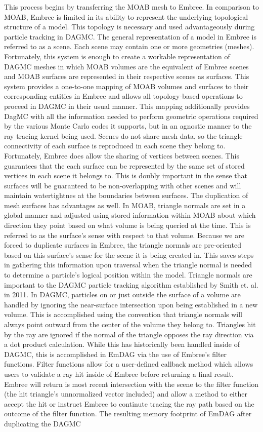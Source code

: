 \documentclass[10pt, a4paper]{article}
\begin{document}
This process begins by transferring the MOAB mesh to Embree. In comparison to MOAB, Embree is limited in its ability to represent the underlying topological structure of a model. This topology is necessary and used advantageously during particle tracking in DAGMC. The general representation of a model in Embree is referred to as a scene. Each scene may contain one or more geometries (meshes). Fortunately, this system is enough to create a workable representation of DAGMC meshes in which MOAB volumes are the equivalent of Embree scenes and MOAB surfaces are represented in their respective scenes as surfaces. This system provides a one-to-one mapping of MOAB volumes and surfaces to their corresponding entities in Embree and allows all topology-based operations to proceed in DAGMC in their usual manner. This mapping additionally provides DagMC with all the information needed to perform geometric operations required by the various Monte Carlo codes it supports, but in an agnostic manner to the ray tracing kernel being used. Scenes do not share mesh data, so the triangle connectivity of each surface is reproduced in each scene they belong to. Fortunately, Embree does allow the sharing of vertices between scenes. This guarantees that the each surface can be represented by the same set of stored vertices in each scene it belongs to. This is doubly important in the sense that surfaces will be guaranteed to be non-overlapping with other scenes and will maintain watertightnes at the boundaries between surfaces. The duplication of mesh surfaces has advantages as well. In MOAB, triangle normals are set in a global manner and adjusted using stored information within MOAB about which direction they point based on what volume is being queried at the time. This is referred to as the surface's sense with respect to that volume. Because we are forced to duplicate surfaces in Embree, the triangle normals are pre-oriented based on this surface's sense for the scene it is being created in. This saves steps in gathering this information upon traversal when the triangle normal is needed to determine a particle's logical position within the model. Triangle normals are important to the DAGMC particle tracking algorithm established by Smith et. al. \cite{smith_thesis} in 2011. In DAGMC, particles on or just outside the surface of a volume are handled by ignoring the near-surface intersection upon being established in a new volume. This is accomplished using the convention that triangle normals will always point outward from the center of the volume they belong to. Triangles hit by the ray are ignored if the normal of the triangle opposes the ray direction via a dot product calculation. While this has historically been handled inside of DAGMC, this is accomplished in EmDAG via the use of Embree's filter functions. Filter functions allow for a user-defined callback method which allows users to validate a ray hit inside of Embree before returning a final result. Embree will return is most recent intersection with the scene to the filter function (the hit triangle's unnormalized vector included) and allow a method to either accept the hit or instruct Embree to continute tracing the ray path based on the outcome of the filter function. The resulting memory footprint of EmDAG after duplicating the DAGMC 
\end{document}
